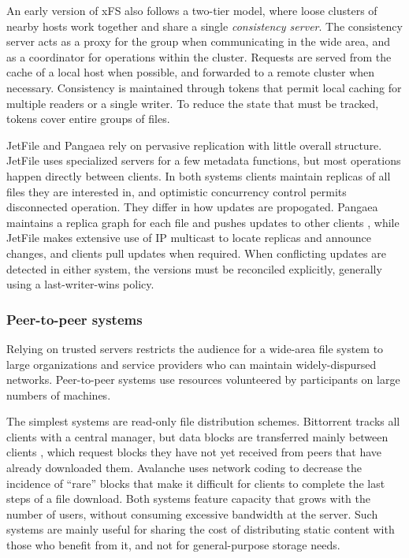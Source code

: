 An early version of xFS \cite{wang93} also follows a two-tier model, where loose clusters of nearby hosts work together and share a single \emph{consistency server}. The consistency server acts as a proxy for the group when communicating in the wide area, and as a coordinator for operations within the cluster. Requests are served from the cache of a local host when possible, and forwarded to a remote cluster when necessary. Consistency is maintained through tokens that permit local caching for multiple readers or a single writer. To reduce the state that must be tracked, tokens cover entire groups of files.

JetFile \cite{gronvall} and Pangaea \cite{saito02a} rely on pervasive replication with little overall structure. JetFile  uses specialized servers for a few metadata functions, but most operations happen directly between clients. In both systems clients maintain replicas of all files they are interested in, and optimistic concurrency control permits disconnected operation. They differ in how updates are propogated. Pangaea maintains a replica graph for each file and pushes updates to other clients \cite{saito02b}, while JetFile makes extensive use of IP multicast to locate replicas and announce changes, and clients pull updates when required. When conflicting updates are detected in either system, the versions must be reconciled explicitly, generally using a last-writer-wins policy.

\subsubsection{Peer-to-peer systems}

Relying on trusted servers restricts the audience for a wide-area file system to large organizations and service providers who can maintain widely-dispursed networks. Peer-to-peer systems use resources volunteered by participants on large numbers of machines.

The simplest systems are read-only file distribution schemes. Bittorrent tracks all clients with a central manager, but data blocks are transferred mainly between clients \cite{cohen,pouwelse}, which request blocks they have not yet received from peers that have already downloaded them. Avalanche \cite{gkantsidis} uses network coding to decrease the incidence of ``rare'' blocks that make it difficult for clients to complete the last steps of a file download. Both systems feature capacity that grows with the number of users, without consuming excessive bandwidth at the server. Such systems are mainly useful for sharing the cost of distributing static content with those who benefit from it, and not for general-purpose storage needs.

